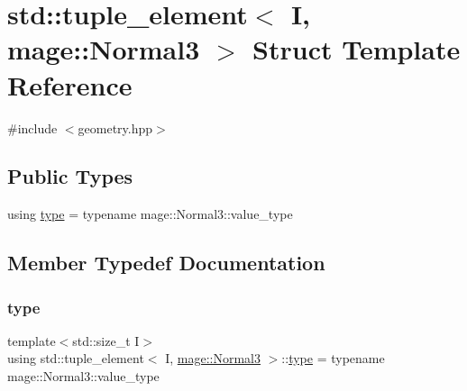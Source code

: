 \hypertarget{structstd_1_1tuple__element_3_01_i_00_01mage_1_1_normal3_01_4}{}\section{std\+:\+:tuple\+\_\+element$<$ I, mage\+:\+:Normal3 $>$ Struct Template Reference}
\label{structstd_1_1tuple__element_3_01_i_00_01mage_1_1_normal3_01_4}


{\ttfamily \#include $<$geometry.\+hpp$>$}

\subsection*{Public Types}
\begin{DoxyCompactItemize}
\item 
using \mbox{\hyperlink{structstd_1_1tuple__element_3_01_i_00_01mage_1_1_normal3_01_4_a02fab6104a3747895b4c028748109c45}{type}} = typename mage\+::\+Normal3\+::value\+\_\+type
\end{DoxyCompactItemize}


\subsection{Member Typedef Documentation}
\mbox{\label{structstd_1_1tuple__element_3_01_i_00_01mage_1_1_normal3_01_4_a02fab6104a3747895b4c028748109c45}} 
\subsubsection{\texorpdfstring{type}{type}}
{\footnotesize\ttfamily template$<$std\+::size\+\_\+t I$>$ \\
using std\+::tuple\+\_\+element$<$ I, \mbox{\hyperlink{structmage_1_1_normal3}{mage\+::\+Normal3}} $>$\+::\mbox{\hyperlink{structstd_1_1tuple__element_3_01_i_00_01mage_1_1_normal3_01_4_a02fab6104a3747895b4c028748109c45}{type}} =  typename mage\+::\+Normal3\+::value\+\_\+type}

